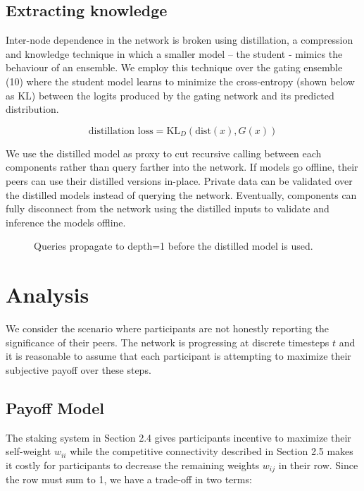 \documentclass{article}
\begin{document}
\subsection{Extracting knowledge}

Inter-node dependence in the network is broken using distillation\cite{hinton2015distilling}, a compression and knowledge technique in which a smaller model -- the student - mimics the behaviour of an ensemble. We employ this technique over the gating ensemble (10) where the student model learns to minimize the cross-entropy (shown below as KL) between the logits produced by the gating network and its predicted distribution. \cite{Sanh2019DistilBERT}
\smallskip

\begin{equation}
\textrm{distillation loss} = \text{KL}_D(\text{dist}(x), G(x)) 
\end{equation}

We use the distilled model as proxy to cut recursive calling between each components rather than query farther into the network. If models go offline, their peers can use their distilled versions in-place. Private data can be validated over the distilled models instead of querying the network. Eventually, components can fully disconnect from the network using the distilled inputs to validate and inference the models offline.
\smallskip

\begin{figure}[H]
	\centering
	\hspace*{0cm}
	
	\caption{Queries propagate to depth=1 before the distilled model is used.}
\end{figure}{}

\section{Analysis}
\label{analysis}

We consider the scenario where participants are not honestly reporting the significance of their peers. The network is progressing at discrete timesteps $t$ and it is reasonable to assume that each participant is attempting to maximize their subjective payoff over these steps.

\subsection{Payoff Model}

The staking system in Section 2.4 gives participants incentive to maximize their self-weight $w_{ii}$ while the competitive connectivity described in Section 2.5 makes it costly for participants to decrease the remaining weights $w_{ij}$ in their row. Since the row must sum to 1, we have a trade-off in two terms:
\end{document}
